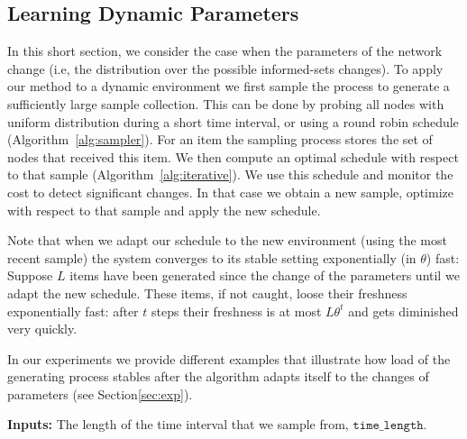 \subsection{Learning Dynamic Parameters}\label{sec:dynamic}
In this short section, we consider the case when the parameters of the network change (i.e, the distribution over the possible informed-sets changes).  To apply our method to a dynamic environment we first sample the process to generate a sufficiently large sample collection. This can be done by probing
 all nodes with uniform distribution during a short time interval, or using a round robin schedule (Algorithm~\ref{alg:sampler}). For an item the sampling process stores the set of nodes that received this item. We then compute an optimal schedule with respect to that sample (Algorithm~\ref{alg:iterative}). We use this schedule and monitor the cost to detect significant changes. In that case we obtain a new sample, optimize with respect to that sample and apply the new schedule. 
 
 Note that when we adapt our schedule to the new environment (using the most recent sample) the system converges to its stable setting exponentially (in $\theta$) fast: Suppose $L$ items have been generated since the change of the parameters until we adapt the new schedule. These items, if not caught, loose their freshness exponentially fast: after $t$ steps their freshness is at most $L\theta^t$ and gets diminished very quickly. 
 
 In our experiments we provide different examples that illustrate how load of the generating process stables after the algorithm adapts itself to the changes of parameters (see Section\ref{sec:exp}).
 
   
\begin{algorithm}[!h]
\BlankLine
{\bf Inputs:} The length of the time interval that we sample from, $\texttt{time\_length}$.


\caption{$\sampler(\texttt{time\_length})$}\label{alg:sampler}
\end{algorithm}  
   

